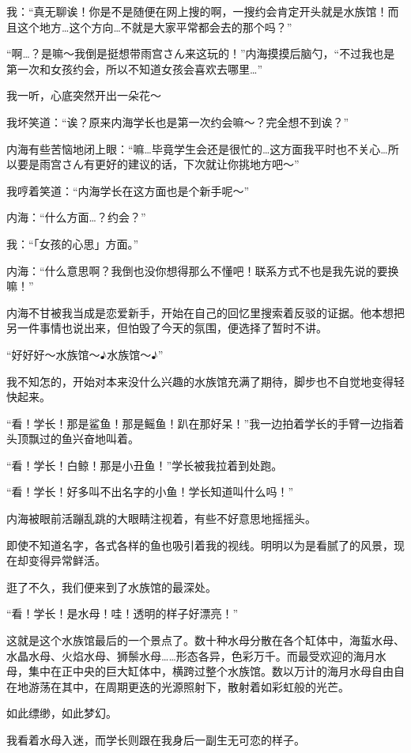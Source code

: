我：“真无聊诶！你是不是随便在网上搜的啊，一搜约会肯定开头就是水族馆！而且这个地方…这个方向…不就是大家平常都会去的那个吗？”

“啊…？是嘛～我倒是挺想带雨宫さん来这玩的！”内海摸摸后脑勺，“不过我也是第一次和女孩约会，所以不知道女孩会喜欢去哪里…”

我一听，心底突然开出一朵花～

我坏笑道：“诶？原来内海学长也是第一次约会嘛～？完全想不到诶？”

内海有些苦恼地闭上眼：“嘛…毕竟学生会还是很忙的…这方面我平时也不关心…所以要是雨宫さん有更好的建议的话，下次就让你挑地方吧～”

我哼着笑道：“内海学长在这方面也是个新手呢～”

内海：“什么方面…？约会？”

我：“「女孩的心思」方面。”

内海：“什么意思啊？我倒也没你想得那么不懂吧！联系方式不也是我先说的要换嘛！”

内海不甘被我当成是恋爱新手，开始在自己的回忆里搜索着反驳的证据。他本想把另一件事情也说出来，但怕毁了今天的氛围，便选择了暂时不讲。

“好好好～水族馆～$\eighthnote$水族馆～$\eighthnote$”

我不知怎的，开始对本来没什么兴趣的水族馆充满了期待，脚步也不自觉地变得轻快起来。


“看！学长！那是鲨鱼！那是鳐鱼！趴在那好呆！”我一边拍着学长的手臂一边指着头顶飘过的鱼兴奋地叫着。

“看！学长！白鲸！那是小丑鱼！”学长被我拉着到处跑。

“看！学长！好多叫不出名字的小鱼！学长知道叫什么吗！”

内海被眼前活蹦乱跳的大眼睛注视着，有些不好意思地摇摇头。

即使不知道名字，各式各样的鱼也吸引着我的视线。明明以为是看腻了的风景，现在却变得异常鲜活。

逛了不久，我们便来到了水族馆的最深处。

“看！学长！是水母！哇！透明的样子好漂亮！”

这就是这个水族馆最后的一个景点了。数十种水母分散在各个缸体中，海蜇水母、水晶水母、火焰水母、狮鬃水母……形态各异，色彩万千。而最受欢迎的海月水母，集中在正中央的巨大缸体中，横跨过整个水族馆。数以万计的海月水母自由自在地游荡在其中，在周期更迭的光源照射下，散射着如彩虹般的光芒。

如此缥缈，如此梦幻。

我看着水母入迷，而学长则跟在我身后一副生无可恋的样子。

